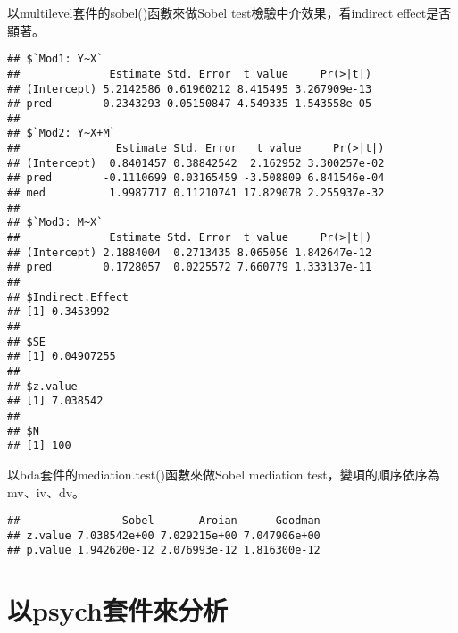 \documentclass[
]{book}
\newenvironment{Shaded}{\begin{snugshade}}{\end{snugshade}}
\newcommand{\FunctionTok}[1]{\textcolor[rgb]{0.00,0.00,0.00}{#1}}
\newcommand{\NormalTok}[1]{#1}
\newcommand{\SpecialCharTok}[1]{\textcolor[rgb]{0.00,0.00,0.00}{#1}}
\begin{document}
以multilevel套件的sobel()函數來做Sobel test檢驗中介效果，看indirect effect是否顯著。

\begin{Shaded}
\end{Shaded}

\begin{verbatim}
## $`Mod1: Y~X`
##              Estimate Std. Error  t value     Pr(>|t|)
## (Intercept) 5.2142586 0.61960212 8.415495 3.267909e-13
## pred        0.2343293 0.05150847 4.549335 1.543558e-05
## 
## $`Mod2: Y~X+M`
##               Estimate Std. Error   t value     Pr(>|t|)
## (Intercept)  0.8401457 0.38842542  2.162952 3.300257e-02
## pred        -0.1110699 0.03165459 -3.508809 6.841546e-04
## med          1.9987717 0.11210741 17.829078 2.255937e-32
## 
## $`Mod3: M~X`
##              Estimate Std. Error  t value     Pr(>|t|)
## (Intercept) 2.1884004  0.2713435 8.065056 1.842647e-12
## pred        0.1728057  0.0225572 7.660779 1.333137e-11
## 
## $Indirect.Effect
## [1] 0.3453992
## 
## $SE
## [1] 0.04907255
## 
## $z.value
## [1] 7.038542
## 
## $N
## [1] 100
\end{verbatim}

以bda套件的mediation.test()函數來做Sobel mediation test，變項的順序依序為mv、iv、dv。

\begin{Shaded}
\end{Shaded}

\begin{verbatim}
##                Sobel       Aroian      Goodman
## z.value 7.038542e+00 7.029215e+00 7.047906e+00
## p.value 1.942620e-12 2.076993e-12 1.816300e-12
\end{verbatim}

\hypertarget{ux4ee5psychux5957ux4ef6ux4f86ux5206ux6790}{%
\section{以psych套件來分析}\label{ux4ee5psychux5957ux4ef6ux4f86ux5206ux6790}}
\end{document}
